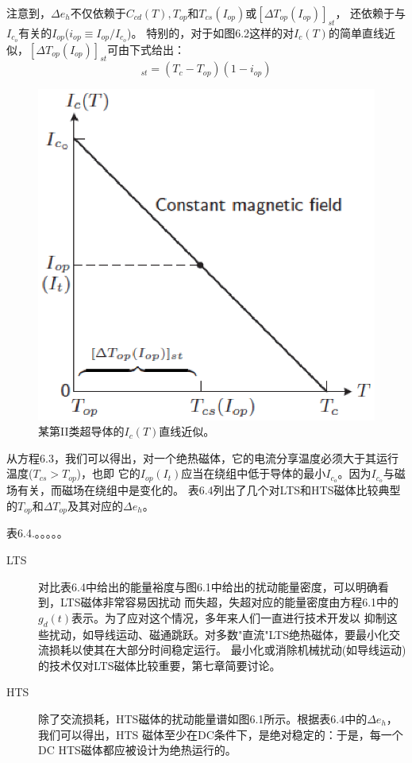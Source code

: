 注意到，$\Delta e_h$不仅依赖于$C_{cd}(T),T_{op}$和$T_{cs}(I_{op})$或$[\Delta T_{op}(I_{op})]_{st}$，
还依赖于与$I_{c_o}$有关的$I_{op}$($i_{op}\equiv I_{op}/I_{c_o}$)。
特别的，对于如图6.2这样的对$I_c(T)$的简单直线近似，$[\Delta T_{op}(I_{op})]_{st}$可由下式给出：
\begin{equation}%
[\Delta T_{op}(I_{op})]_{st}=(T_c-T_{op})(1-i_{op})
\end{equation}
\begin{figure}[htbp]
	\centering
	\includegraphics[scale=0.7]{chpt6/figs/fig6.2.eps}
	\caption{某第II类超导体的$I_c(T)$直线近似。}
\end{figure}

从方程6.3，我们可以得出，对一个绝热磁体，它的电流分享温度必须大于其运行温度($T_{cs}>T_{op}$)，也即
它的$I_{op}(I_t)$应当在绕组中低于导体的最小$I_{c_o}$。因为$I_{c_o}$与磁场有关，而磁场在绕组中是变化的。
表6.4列出了几个对LTS和HTS磁体比较典型的$T_{op}$和$\Delta T_{op}$及其对应的$\Delta e_h$。

表6.4.。。。。。

\begin{description}
	\item[LTS] 对比表6.4中给出的能量裕度与图6.1中给出的扰动能量密度，可以明确看到，LTS磁体非常容易因扰动
	而失超，失超对应的能量密度由方程6.1中的$g_d(t)$表示。为了应对这个情况，多年来人们一直进行技术开发以
	抑制这些扰动，如导线运动、磁通跳跃。对多数"直流"LTS绝热磁体，要最小化交流损耗以使其在大部分时间稳定运行。
	最小化或消除机械扰动(如导线运动)的技术仅对LTS磁体比较重要，第七章简要讨论。
	\item[HTS] 除了交流损耗，HTS磁体的扰动能量谱如图6.1所示。根据表6.4中的$\Delta e_h$，我们可以得出，HTS
	磁体至少在DC条件下，是绝对稳定的：于是，每一个DC HTS磁体都应被设计为绝热运行的。
\end{description}

